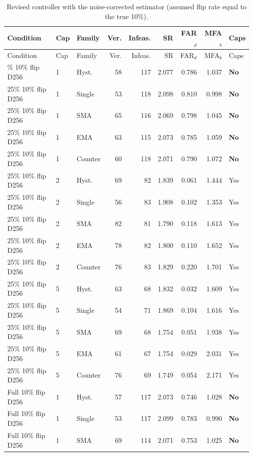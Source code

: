 {\footnotesize\setlength{\tabcolsep}{4pt}
\begin{longtable}{lllrrrrrl}
\caption{Revised controller with the noise-corrected estimator (assumed flip rate equal to the true 10\%).}\label{tab:s7_dyn_corr}\\
\toprule
Condition & Cap & Family & Ver. & Infeas. & SR & FAR$_d$ & MFA$_b$ & Caps\\
\midrule
\endfirsthead
\toprule
Condition & Cap & Family & Ver. & Infeas. & SR & FAR$_d$ & MFA$_b$ & Caps\\
\midrule
\endhead
\bottomrule
\endfoot
25\% 10\% flip D256 & 1 & Hyst. & 58 & 117 & 2.077 & 0.786 & 1.037 & \textbf{No}\\
25\% 10\% flip D256 & 1 & Single & 53 & 118 & 2.098 & 0.810 & 0.998 & \textbf{No}\\
25\% 10\% flip D256 & 1 & SMA & 65 & 116 & 2.069 & 0.798 & 1.045 & \textbf{No}\\
25\% 10\% flip D256 & 1 & EMA & 63 & 115 & 2.073 & 0.785 & 1.059 & \textbf{No}\\
25\% 10\% flip D256 & 1 & Counter & 60 & 118 & 2.071 & 0.790 & 1.072 & \textbf{No}\\
25\% 10\% flip D256 & 2 & Hyst. & 69 & 82 & 1.839 & 0.061 & 1.444 & Yes\\
25\% 10\% flip D256 & 2 & Single & 56 & 83 & 1.908 & 0.102 & 1.353 & Yes\\
25\% 10\% flip D256 & 2 & SMA & 82 & 81 & 1.790 & 0.118 & 1.613 & Yes\\
25\% 10\% flip D256 & 2 & EMA & 78 & 82 & 1.800 & 0.110 & 1.652 & Yes\\
25\% 10\% flip D256 & 2 & Counter & 76 & 83 & 1.829 & 0.220 & 1.701 & Yes\\
25\% 10\% flip D256 & 5 & Hyst. & 63 & 68 & 1.832 & 0.032 & 1.609 & Yes\\
25\% 10\% flip D256 & 5 & Single & 54 & 71 & 1.869 & 0.104 & 1.616 & Yes\\
25\% 10\% flip D256 & 5 & SMA & 69 & 68 & 1.754 & 0.051 & 1.938 & Yes\\
25\% 10\% flip D256 & 5 & EMA & 61 & 67 & 1.754 & 0.029 & 2.031 & Yes\\
25\% 10\% flip D256 & 5 & Counter & 76 & 69 & 1.749 & 0.054 & 2.171 & Yes\\
Full 10\% flip D256 & 1 & Hyst. & 57 & 117 & 2.073 & 0.746 & 1.028 & \textbf{No}\\
Full 10\% flip D256 & 1 & Single & 53 & 117 & 2.099 & 0.783 & 0.990 & \textbf{No}\\
Full 10\% flip D256 & 1 & SMA & 69 & 114 & 2.071 & 0.753 & 1.025 & \textbf{No}\\

\end{longtable}}
